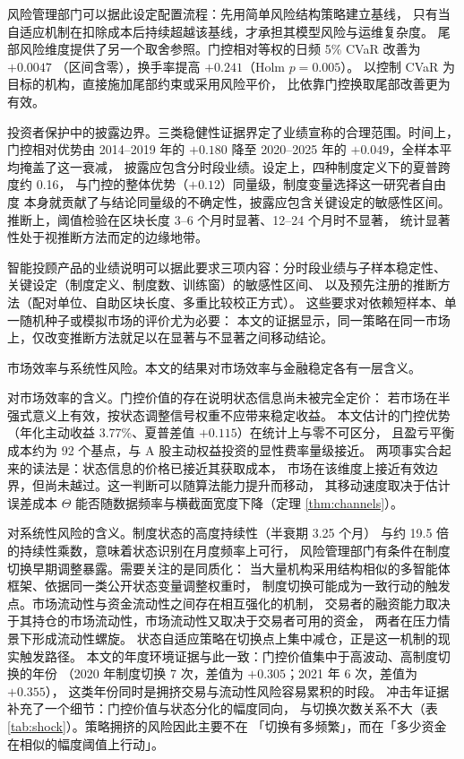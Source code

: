 风险管理部门可以据此设定配置流程：先用简单风险结构策略建立基线，
只有当自适应机制在扣除成本后持续超越该基线，才承担其模型风险与运维复杂度。
尾部风险维度提供了另一个取舍参照。门控相对等权的日频 5\% CVaR 改善为 $+0.0047$
（区间含零），换手率提高 $+0.241$（Holm $p=0.005$）。
以控制 CVaR 为目标的机构，直接施加尾部约束或采用风险平价，
比依靠门控换取尾部改善更为有效。

投资者保护中的披露边界。三类稳健性证据界定了业绩宣称的合理范围。时间上，门控相对优势由 2014--2019 年的
$+0.180$ 降至 2020--2025 年的 $+0.049$，全样本平均掩盖了这一衰减，
披露应包含分时段业绩。设定上，四种制度定义下的夏普跨度约 0.16，
与门控的整体优势（$+0.12$）同量级，制度变量选择这一研究者自由度
本身就贡献了与结论同量级的不确定性，披露应包含关键设定的敏感性区间。
推断上，阈值检验在区块长度 3--6 个月时显著、12--24 个月时不显著，
统计显著性处于视推断方法而定的边缘地带。

智能投顾产品的业绩说明可以据此要求三项内容：分时段业绩与子样本稳定性、
关键设定（制度定义、制度数、训练窗）的敏感性区间、
以及预先注册的推断方法（配对单位、自助区块长度、多重比较校正方式）。
这些要求对依赖短样本、单一随机种子或模拟市场的评价尤为必要：
本文的证据显示，同一策略在同一市场上，仅改变推断方法就足以在显著与不显著之间移动结论。

市场效率与系统性风险。本文的结果对市场效率与金融稳定各有一层含义。

对市场效率的含义。门控价值的存在说明状态信息尚未被完全定价：
若市场在半强式意义上有效，按状态调整信号权重不应带来稳定收益\cite{grossman1980}。
本文估计的门控优势（年化主动收益 3.77\%、夏普差值 $+0.115$）在统计上与零不可区分，
且盈亏平衡成本约为 92 个基点，与 A 股主动权益投资的显性费率量级接近。
两项事实合起来的读法是：状态信息的价格已接近其获取成本，
市场在该维度上接近有效边界，但尚未越过。这一判断可以随算法能力提升而移动，
其移动速度取决于估计误差成本 $\Theta$ 能否随数据频率与横截面宽度下降（定理 \ref{thm:channels}）。

对系统性风险的含义。制度状态的高度持续性（半衰期 3.25 个月）
与约 19.5 倍的持续性乘数，意味着状态识别在月度频率上可行，
风险管理部门有条件在制度切换早期调整暴露。需要关注的是同质化：
当大量机构采用结构相似的多智能体框架、依据同一类公开状态变量调整权重时，
制度切换可能成为一致行动的触发点。市场流动性与资金流动性之间存在相互强化的机制，
交易者的融资能力取决于其持仓的市场流动性，市场流动性又取决于交易者可用的资金，
两者在压力情景下形成流动性螺旋\cite{brunnermeier2009}。
状态自适应策略在切换点上集中减仓，正是这一机制的现实触发路径。
本文的年度环境证据与此一致：门控价值集中于高波动、高制度切换的年份
（2020 年制度切换 7 次，差值为 $+0.305$；2021 年 6 次，差值为 $+0.355$），
这类年份同时是拥挤交易与流动性风险容易累积的时段。
冲击年证据补充了一个细节：门控价值与状态分化的幅度同向，
与切换次数关系不大（表 \ref{tab:shock}）。策略拥挤的风险因此主要不在
「切换有多频繁」，而在「多少资金在相似的幅度阈值上行动」。

